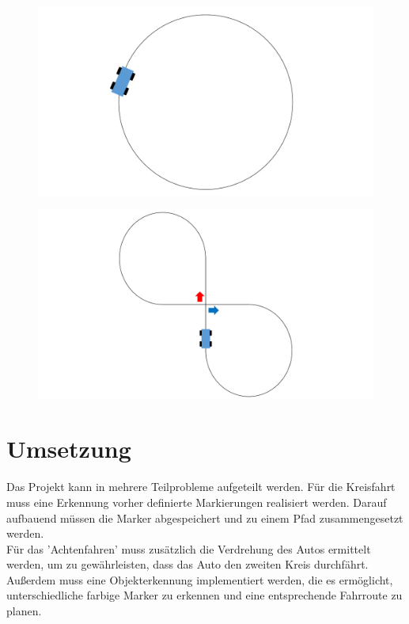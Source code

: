 \documentclass[DIV=15, notitlepage,10pt]{article}
\begin{document}
\begin{figure}[h]
\centering
\begin{minipage}{.5\textwidth}
  \centering
  \includegraphics[width=1\linewidth]{Kreis.pdf}
  \label{fig:test1}
\end{minipage}%
\begin{minipage}{.5\textwidth}
  \centering
  \includegraphics[width=1\linewidth]{Acht2.pdf}
  \label{fig:test2}
\end{minipage}
\end{figure}

\section{Umsetzung}
Das Projekt kann in mehrere Teilprobleme aufgeteilt werden. Für die Kreisfahrt muss eine Erkennung vorher definierte Markierungen realisiert werden. Darauf aufbauend müssen die Marker abgespeichert und zu einem Pfad zusammengesetzt werden. \\
Für das 'Achtenfahren' muss zusätzlich die Verdrehung des Autos ermittelt werden, um zu gewährleisten, dass das Auto den zweiten Kreis durchfährt. 
Außerdem muss eine Objekterkennung implementiert werden, die es ermöglicht, unterschiedliche farbige Marker zu erkennen und eine entsprechende Fahrroute zu planen. 
\end{document}
